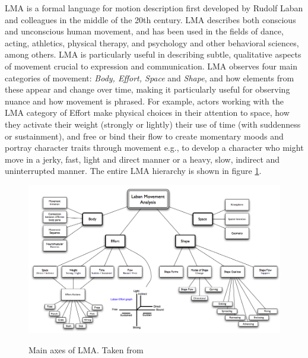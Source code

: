 \documentclass{sigchi}
\begin{document}
LMA is a formal language for motion description first developed by Rudolf Laban \cite{Laban} and colleagues in the middle of the 20th century. LMA describes both conscious
and unconscious human movement, and has been used in
the fields of dance, acting, athletics, physical therapy, and
psychology and other behavioral sciences, among others.
LMA is particularly useful in describing subtle, qualitative
aspects of movement crucial to expression and
communication. LMA observes four main categories of
movement: \textit{Body, Effort, Space} and \textit{Shape}, and how
elements from these appear and change over time, making
it particularly useful for observing nuance and how
movement is phrased. For example, actors
working with the LMA category of Effort make physical
choices in their attention to space, how they activate their
weight (strongly or lightly) their use of time (with
suddenness or sustainment), and free or bind their flow to
create momentary moods and portray character traits
through movement e.g., to develop a character who might move in a jerky, fast, light and direct manner or a heavy, slow, indirect and uninterrupted manner.
The entire LMA hierarchy is shown in figure \ref{labanTree}.
\begin{figure}[ht]
\centering
\caption{Main axes of LMA. Taken from  }\cite{labanTree}
\includegraphics[width=\textwidth]{laban.png}

\label{labanTree}
\end{figure}
\end{document}
